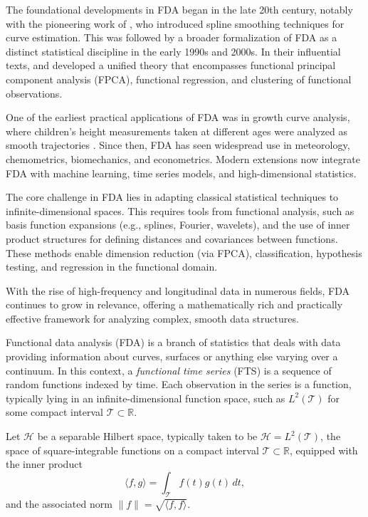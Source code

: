 \documentclass[
	12pt,				%
	oneside,			%
	a4paper,			%
	english,			%
	brazil				%
	]{abntex2ppgsi}
\begin{document}
The foundational developments in FDA began in the late 20th century, notably with the pioneering work of , who introduced spline smoothing techniques for curve estimation. This was followed by a broader formalization of FDA as a distinct statistical discipline in the early 1990s and 2000s. In their influential texts,  and  developed a unified theory that encompasses functional principal component analysis (FPCA), functional regression, and clustering of functional observations.

One of the earliest practical applications of FDA was in growth curve analysis, where children’s height measurements taken at different ages were analyzed as smooth trajectories . Since then, FDA has seen widespread use in meteorology, chemometrics, biomechanics, and econometrics. Modern extensions now integrate FDA with machine learning, time series models, and high-dimensional statistics.

The core challenge in FDA lies in adapting classical statistical techniques to infinite-dimensional spaces. This requires tools from functional analysis, such as basis function expansions (e.g., splines, Fourier, wavelets), and the use of inner product structures for defining distances and covariances between functions. These methods enable dimension reduction (via FPCA), classification, hypothesis testing, and regression in the functional domain.

With the rise of high-frequency and longitudinal data in numerous fields, FDA continues to grow in relevance, offering a mathematically rich and practically effective framework for analyzing complex, smooth data structures.




Functional data analysis (FDA) is a branch of statistics that deals with data providing information about curves, surfaces or anything else varying over a continuum. In this context, a \emph{functional time series} (FTS) is a sequence of random functions indexed by time. Each observation in the series is a function, typically lying in an infinite-dimensional function space, such as $L^2(\mathcal{T})$ for some compact interval $\mathcal{T} \subset \mathbb{R}$.

Let $\mathcal{H}$ be a separable Hilbert space, typically taken to be $\mathcal{H} = L^2(\mathcal{T})$, the space of square-integrable functions on a compact interval $\mathcal{T} \subset \mathbb{R}$, equipped with the inner product
\[
\langle f, g \rangle = \int_{\mathcal{T}} f(t) g(t) \, dt,
\]
and the associated norm $\|f\| = \sqrt{\langle f, f \rangle}$.
\end{document}
